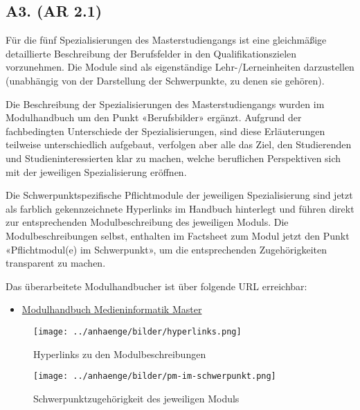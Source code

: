 \subsection{A3. (AR 2.1)
\label{/mi-2017/selbstbericht/auflagen/0000-auflagen}}\label{a3.-ar-2.1-pathlabelmi-2017selbstberichtauflagen0000-auflagen}

\begin{siderules}
Für die fünf Spezialisierungen des Masterstudiengangs ist eine
gleichmäßige detaillierte Beschreibung der Berufsfelder in den
Qualifikationszielen vorzunehmen. Die Module sind als eigenständige
Lehr-/Lerneinheiten darzustellen (unabhängig von der Darstellung der
Schwerpunkte, zu denen sie gehören).
\end{siderules}

Die Beschreibung der Spezialisierungen des Masterstudiengangs wurden im
Modulhandbuch um den Punkt «Berufsbilder» ergänzt. Aufgrund der
fachbedingten Unterschiede der Spezialisierungen, sind diese
Erläuterungen teilweise unterschiedlich aufgebaut, verfolgen aber alle
das Ziel, den Studierenden und Studieninteressierten klar zu machen,
welche beruflichen Perspektiven sich mit der jeweiligen Spezialisierung
eröffnen.

Die Schwerpunktspezifische Pflichtmodule der jeweiligen Spezialisierung
sind jetzt als farblich gekennzeichnete Hyperlinks im Handbuch
hinterlegt und führen direkt zur entsprechenden Modulbeschreibung des
jeweiligen Moduls. Die Modulbeschreibungen selbst, enthalten im
Factsheet zum Modul jetzt den Punkt «Pflichtmodul(e) im Schwerpunkt», um
die entsprechenden Zugehörigkeiten transparent zu machen.

Das überarbeitete Modulhandbucher ist über folgende URL erreichbar:

\begin{itemize}
\tightlist
\item
  \href{http://www.medieninformatik.th-koeln.de/download/modulbeschreibungen-master-mpo4.pdf}{Modulhandbuch
  Medieninformatik Master}
\end{itemize}

\begin{figure}[htbp]
\centering
\texttt{[image: ../anhaenge/bilder/hyperlinks.png]}
\caption{Hyperlinks zu den Modulbeschreibungen}
\end{figure}

\begin{figure}[htbp]
\centering
\texttt{[image: ../anhaenge/bilder/pm-im-schwerpunkt.png]}
\caption{Schwerpunktzugehörigkeit des jeweiligen Moduls}
\end{figure}
